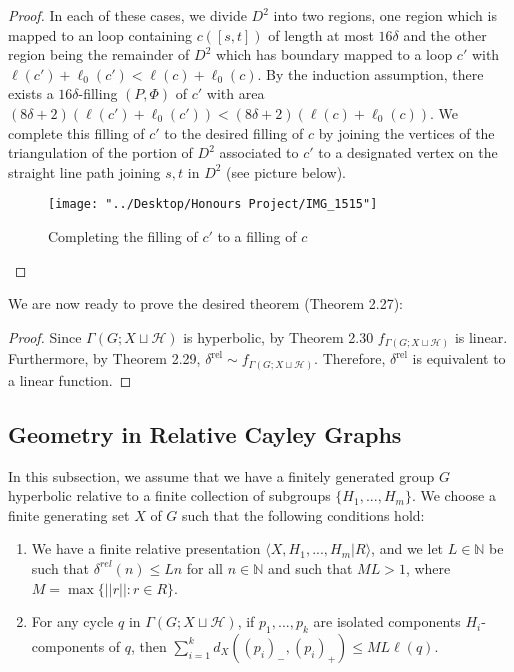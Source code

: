 \documentclass[12pt]{article}
\newcommand{\vs}{\vskip10pt}
\begin{document}
\begin{proof}
		In each of these cases, we divide $D^2$ into two regions, one region which is mapped to an loop containing $c([s,t])$ of length at most $16 \delta$ and the other region being the remainder of $D^2$ which has boundary mapped to a loop $c'$ with $\ell(c') + \ell_0(c') < \ell(c) + \ell_0(c)$. By the induction assumption, there exists a $16 \delta$-filling $(P, \Phi)$ of $c'$ with area $(8 \delta + 2)(\ell(c') + \ell_0(c')) < (8 \delta + 2)(\ell(c) + \ell_0(c))$. We complete this filling of $c'$ to the desired filling of $c$ by joining the vertices of the triangulation of the portion of $D^2$ associated to $c'$ to a designated vertex on the straight line path joining $s,t$ in $D^2$ (see picture below). 

\begin{figure} [H]
	\centering
	\texttt{[image: "../Desktop/Honours Project/IMG\_1515"]}
	\caption{Completing the filling of $c'$ to a filling of $c$}
	\label{fig:img1515}
\end{figure}
		
	\end{proof}

	\vs
	
	We are now ready to prove the desired theorem (Theorem 2.27):
	
	\begin{proof}
		
		Since $\Gamma(G; X \sqcup \mathcal{H})$ is hyperbolic, by Theorem 2.30 $f_{\Gamma(G; X \sqcup \mathcal{H})}$ is linear. Furthermore, by Theorem 2.29, $\delta^{\text{rel}} \sim f_{\Gamma(G; X \sqcup \mathcal{H})}$. Therefore, $\delta^{\text{rel}}$ is equivalent to a linear function.
		
	\end{proof} 


\newpage
	\subsection{Geometry in Relative Cayley Graphs}
	
	In this subsection, we assume that we have a finitely generated group $G$ hyperbolic relative to a finite collection of subgroups $\{H_1,...,H_m\}$. We choose a finite generating set $X$ of $G$ such that the following conditions hold: 
	
	\begin{enumerate}[label = (\roman*)]
		\item We have a finite relative presentation $\langle X, H_1,...,H_m \vert R \rangle$, and we let $L \in \mathbb{N}$ be such that $\delta^{rel}(n) \leq Ln$ for all $n \in \mathbb{N}$ and such that $ML > 1$, where $M = \max \{\vert \vert r \vert \vert : r \in R\}$.
		\item For any cycle $q$ in $\Gamma(G; X \sqcup \mathcal{H})$, if $p_1,...,p_k$ are isolated components $H_i$-components of $q$, then $\sum_{i=1}^k d_X((p_i)_-, (p_i)_+) \leq ML \ell(q)$.
	\end{enumerate}
	
\end{document}
